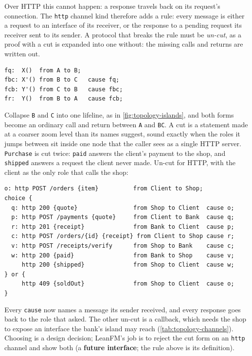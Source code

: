 Over HTTP this cannot happen: a response travels back on its request's
connection. The \texttt{http} channel kind therefore adds a rule: every message
is either a request to an interface of its receiver, or the response to a pending
request its receiver sent to its sender. A protocol that breaks the rule must be
\emph{un-cut}, as a proof with a cut is expanded into one without: the missing
calls and returns are written out.

\begin{lstlisting}[language={}]
fq:  X()  from A to B;
fbc: X'() from B to C   cause fq;
fcb: Y'() from C to B   cause fbc;
fr:  Y()  from B to A   cause fcb;
\end{lstlisting}

Collapse \texttt{B} and \texttt{C} into one lifeline, as in
\cref{fig:topology-islands}, and both forms become an ordinary call and return
between \texttt{A} and \texttt{BC}. A cut is a statement made at a coarser zoom
level than its names suggest, sound exactly when the roles it jumps between sit
inside one node that the caller sees as a single HTTP server. \texttt{Purchase}
is cut twice: \texttt{paid} answers the client's payment to the shop, and
\texttt{shipped} answers a request the client never made. Un-cut for HTTP, with
the client as the only role that calls the shop:

\begin{lstlisting}[language={}]
o: http POST /orders {item}          from Client to Shop;
choice {
  q: http 200 {quote}                from Shop to Client  cause o;
  p: http POST /payments {quote}     from Client to Bank  cause q;
  r: http 201 {receipt}              from Bank to Client  cause p;
  c: http POST /orders/{id} {receipt} from Client to Shop cause r;
  v: http POST /receipts/verify      from Shop to Bank    cause c;
  w: http 200 {paid}                 from Bank to Shop    cause v;
     http 200 {shipped}              from Shop to Client  cause w;
} or {
     http 409 {soldOut}              from Shop to Client  cause o;
}
\end{lstlisting}

Every \texttt{cause} now names a message its sender received, and every response
goes back to the role that asked. The other un-cut is a callback, which needs the
shop to expose an interface the bank's island may reach
(\cref{tab:topology-channels}). Choosing is a design decision; LeanFM's job is to
reject the cut form on an \texttt{http} channel and show both (a \textbf{future
interface}; the rule above is its definition).

